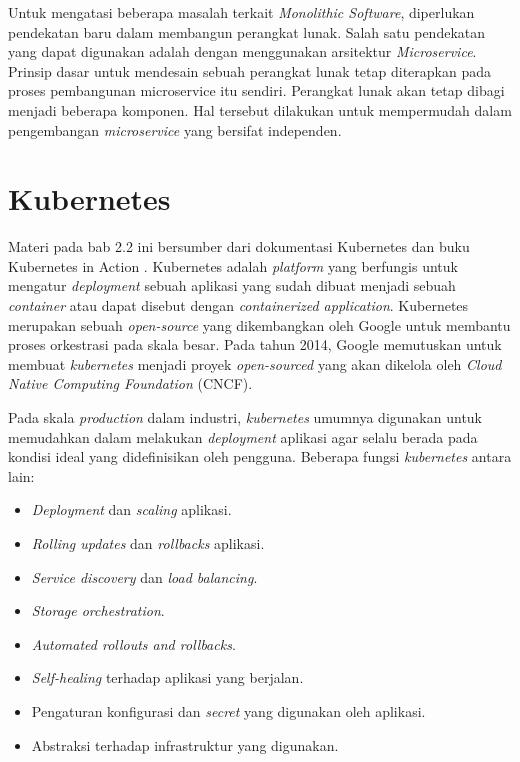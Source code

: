 Untuk mengatasi beberapa masalah terkait \textit{Monolithic Software}, diperlukan pendekatan
baru dalam membangun perangkat lunak. Salah satu pendekatan yang dapat digunakan adalah dengan
menggunakan arsitektur \textit{Microservice}.
Prinsip dasar untuk mendesain sebuah perangkat lunak tetap diterapkan pada proses pembangunan microservice itu sendiri.
Perangkat lunak akan tetap dibagi menjadi beberapa komponen. Hal tersebut dilakukan untuk mempermudah dalam
pengembangan \textit{microservice} yang bersifat independen.

\vspace{0.5cm}
\section{Kubernetes} \label{sec:Kubernetes}
Materi pada bab 2.2 ini bersumber dari dokumentasi Kubernetes \cite{kubernetes2021What} dan buku Kubernetes in Action \cite{KubernetesBook}.
Kubernetes adalah \textit{platform} yang berfungis untuk mengatur \textit{deployment} sebuah aplikasi yang sudah
dibuat menjadi sebuah \textit{container} atau dapat disebut dengan \textit{containerized application}.
Kubernetes merupakan sebuah \textit{open-source} yang dikembangkan oleh Google untuk membantu proses orkestrasi pada skala besar.
Pada tahun 2014, Google memutuskan untuk membuat \textit{kubernetes} menjadi proyek \textit{open-sourced} yang
akan dikelola oleh \textit{Cloud Native Computing Foundation} (CNCF).

Pada skala \textit{production} dalam industri, \textit{kubernetes} umumnya digunakan
untuk memudahkan dalam melakukan \textit{deployment} aplikasi agar selalu berada pada kondisi ideal
yang didefinisikan oleh pengguna. Beberapa fungsi \textit{kubernetes} antara lain:
\begin{itemize}
    \item \textit{Deployment} dan \textit{scaling} aplikasi.
    \item \textit{Rolling updates} dan \textit{rollbacks} aplikasi.
    \item \textit{Service discovery} dan \textit{load balancing}.
    \item \textit{Storage orchestration}.
    \item \textit{Automated rollouts and rollbacks}.
    \item \textit{Self-healing} terhadap aplikasi yang berjalan.
    \item Pengaturan konfigurasi dan \textit{secret} yang digunakan oleh aplikasi.
    \item Abstraksi terhadap infrastruktur yang digunakan.
\end{itemize}


